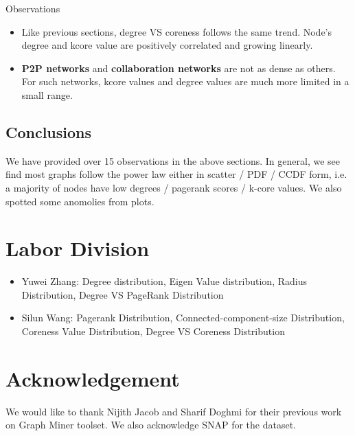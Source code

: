 Observations
\begin{itemize}
\item Like previous sections, degree VS coreness follows the same trend. Node's degree and kcore value are positively correlated and growing linearly. 
\item \textbf{P2P networks} and \textbf{collaboration networks} are not as dense as others. For such networks, kcore values and degree values are much more limited in a small range.
\end{itemize}

\subsection{Conclusions}

We have provided over 15 observations in the above sections. In general, we see find most graphs follow the power law either in scatter / PDF / CCDF form, i.e. a majority of nodes have low degrees / pagerank scores / k-core values. We also spotted some anomolies from plots. 

\section{Labor Division}

\begin{itemize}
\item Yuwei Zhang: Degree distribution, Eigen Value distribution, Radius Distribution, Degree VS PageRank Distribution
\item Silun Wang: Pagerank Distribution, Connected-component-size Distribution, Coreness Value Distribution, Degree VS Coreness Distribution
\end{itemize}

\section{Acknowledgement}

We would like to thank Nijith Jacob and Sharif Doghmi for their previous work on Graph Miner toolset. We also acknowledge SNAP for the dataset.
